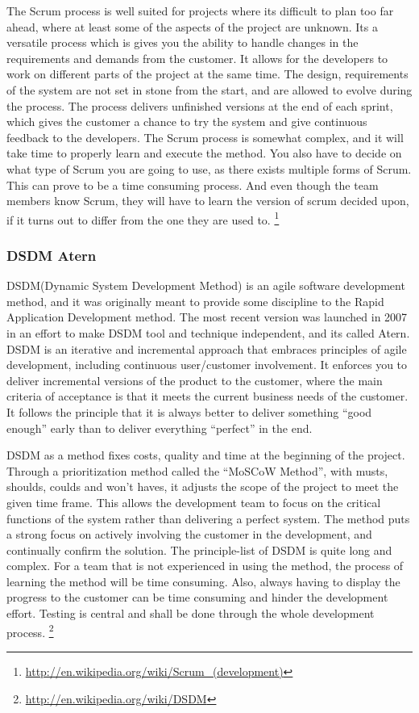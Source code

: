 The Scrum process is well suited for projects where its difficult to plan too far ahead, where at least some of the aspects of the project are unknown. Its a versatile process which is gives you the ability to handle changes in the requirements and demands from the customer. It allows for the developers to work on different parts of the project at the same time. The design, requirements of the system are not set in stone from the start, and are allowed to evolve during the process. The process delivers unfinished versions at the end of each sprint, which gives the customer a chance to try the system and give continuous feedback to the developers. The Scrum process is somewhat complex, and it will take time to properly learn and execute the method. You also have to decide on what type of Scrum you are going to use, as there exists multiple forms of Scrum. This can prove to be a time consuming process. And even though the team members know Scrum, they will have to learn the version of scrum decided upon, if it turns out to differ from the one they are used to.
\footnote{\url{http://en.wikipedia.org/wiki/Scrum_(development)}}

\subsubsection{DSDM Atern}
DSDM(Dynamic System Development Method) is an agile software development method, and it was originally meant to provide some discipline to the Rapid Application Development method. The most recent version was launched in 2007 in an effort to make DSDM tool and technique independent, and its called Atern. DSDM is an iterative and incremental approach that embraces principles of agile development, including continuous user/customer involvement. It enforces you to deliver incremental versions of the product to the customer, where the main criteria of acceptance is that it meets the current business needs of the customer. It follows the principle that it is always better to deliver something “good enough” early than to deliver everything “perfect” in the end.

DSDM as a method fixes costs, quality and time at the beginning of the project. Through a prioritization method called the “MoSCoW Method”, with musts, shoulds, coulds and won’t haves, it adjusts the scope of the project to meet the given time frame. This allows the development team to focus on the critical functions of the system rather than delivering a perfect system. The method puts a strong focus on actively involving the customer in the development, and continually confirm the solution. The principle-list of DSDM is quite long and complex. For a team that is not experienced in using the method, the process of learning the method will be time consuming. Also, always having to display the progress to the customer can be time consuming and hinder the development effort. Testing is central and shall be done through the whole development process.
\footnote{\url{http://en.wikipedia.org/wiki/DSDM}}

